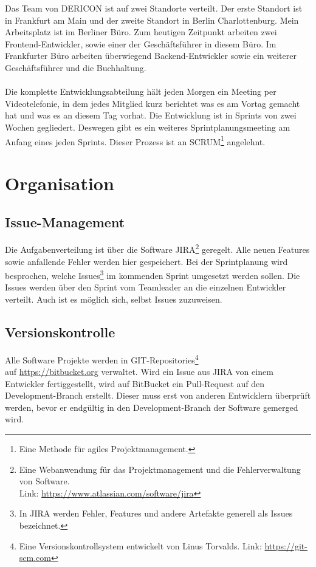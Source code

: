 \documentclass[chapterprefix=false, 12pt, a4paper, oneside, parskip=half, listof=totoc, bibliography=totoc, numbers=noendperiod]{scrbook}
\begin{document}
    Das Team von DERICON ist auf zwei Standorte verteilt. Der erste Standort ist in Frankfurt am Main und der zweite Standort in Berlin Charlottenburg.
    Mein Arbeitsplatz ist im Berliner Büro. Zum heutigen Zeitpunkt arbeiten zwei Frontend-Entwickler, sowie einer der Geschäftsführer in diesem Büro.
    Im Frankfurter Büro arbeiten überwiegend Backend-Entwickler sowie ein weiterer Geschäftsführer und die Buchhaltung.
    \\ \\
    Die komplette Entwicklungsabteilung hält jeden Morgen ein Meeting per Videotelefonie, in dem jedes Mitglied kurz berichtet
    was es am Vortag gemacht hat und was es an diesem Tag vorhat.
    Die Entwicklung ist in Sprints von zwei Wochen gegliedert. Deswegen gibt es ein weiteres Sprintplanungsmeeting am Anfang eines jeden Sprints.
    Dieser Prozess ist an SCRUM\footnote{Eine Methode für agiles Projektmanagement.} angelehnt.

    \section{Organisation}

    \subsection{Issue-Management}

    Die Aufgabenverteilung ist über die Software JIRA\footnote{Eine Webanwendung für das Projektmanagement und die Fehlerverwaltung von Software. \\ Link: \url{https://www.atlassian.com/software/jira}} geregelt.
    Alle neuen Features sowie anfallende Fehler werden hier gespeichert.
    Bei der Sprintplanung wird besprochen, welche Issues\footnote{In JIRA werden Fehler, Features und andere Artefakte generell als Issues bezeichnet.}
    im kommenden Sprint umgesetzt werden sollen. Die Issues werden über den Sprint vom Teamleader an die einzelnen Entwickler verteilt. Auch ist es möglich sich, selbst Issues zuzuweisen.

    \pagebreak

    \subsection{Versionskontrolle}

    Alle Software Projekte werden in GIT-Repositories\footnote{Eine Versionskontrollsystem entwickelt von Linus Torvalds. Link: \url{https://git-scm.com}} \\
    auf \url{https://bitbucket.org} verwaltet.
    Wird ein Issue aus JIRA von einem Entwickler fertiggestellt, wird auf BitBucket ein Pull-Request auf den Development-Branch erstellt.
    Dieser muss erst von anderen Entwicklern überprüft werden, bevor er endgültig in den Development-Branch der Software
    gemerged wird.
\end{document}
